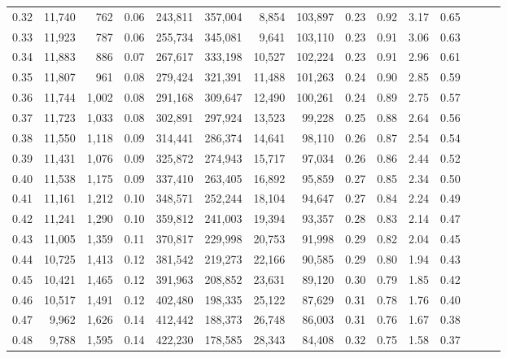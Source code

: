 \begin{tabular}{rrrrrrrrrrrrrrr}
0.32 &  11,740 &    762 &  0.06 &  243,811 &  357,004 &    8,854 &  103,897 &  0.23 &  0.92 &  3.17 &      0.65 \\
0.33 &  11,923 &    787 &  0.06 &  255,734 &  345,081 &    9,641 &  103,110 &  0.23 &  0.91 &  3.06 &      0.63 \\
0.34 &  11,883 &    886 &  0.07 &  267,617 &  333,198 &   10,527 &  102,224 &  0.23 &  0.91 &  2.96 &      0.61 \\
0.35 &  11,807 &    961 &  0.08 &  279,424 &  321,391 &   11,488 &  101,263 &  0.24 &  0.90 &  2.85 &      0.59 \\
0.36 &  11,744 &  1,002 &  0.08 &  291,168 &  309,647 &   12,490 &  100,261 &  0.24 &  0.89 &  2.75 &      0.57 \\
0.37 &  11,723 &  1,033 &  0.08 &  302,891 &  297,924 &   13,523 &   99,228 &  0.25 &  0.88 &  2.64 &      0.56 \\
0.38 &  11,550 &  1,118 &  0.09 &  314,441 &  286,374 &   14,641 &   98,110 &  0.26 &  0.87 &  2.54 &      0.54 \\
0.39 &  11,431 &  1,076 &  0.09 &  325,872 &  274,943 &   15,717 &   97,034 &  0.26 &  0.86 &  2.44 &      0.52 \\
0.40 &  11,538 &  1,175 &  0.09 &  337,410 &  263,405 &   16,892 &   95,859 &  0.27 &  0.85 &  2.34 &      0.50 \\
0.41 &  11,161 &  1,212 &  0.10 &  348,571 &  252,244 &   18,104 &   94,647 &  0.27 &  0.84 &  2.24 &      0.49 \\
0.42 &  11,241 &  1,290 &  0.10 &  359,812 &  241,003 &   19,394 &   93,357 &  0.28 &  0.83 &  2.14 &      0.47 \\
0.43 &  11,005 &  1,359 &  0.11 &  370,817 &  229,998 &   20,753 &   91,998 &  0.29 &  0.82 &  2.04 &      0.45 \\
0.44 &  10,725 &  1,413 &  0.12 &  381,542 &  219,273 &   22,166 &   90,585 &  0.29 &  0.80 &  1.94 &      0.43 \\
0.45 &  10,421 &  1,465 &  0.12 &  391,963 &  208,852 &   23,631 &   89,120 &  0.30 &  0.79 &  1.85 &      0.42 \\
0.46 &  10,517 &  1,491 &  0.12 &  402,480 &  198,335 &   25,122 &   87,629 &  0.31 &  0.78 &  1.76 &      0.40 \\
0.47 &   9,962 &  1,626 &  0.14 &  412,442 &  188,373 &   26,748 &   86,003 &  0.31 &  0.76 &  1.67 &      0.38 \\
0.48 &   9,788 &  1,595 &  0.14 &  422,230 &  178,585 &   28,343 &   84,408 &  0.32 &  0.75 &  1.58 &      0.37 \\

\end{tabular}
